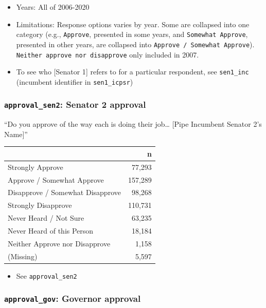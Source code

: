 \documentclass[10pt,article,oneside]{memoir}
\theoremstyle{definition}
\begin{document}
\begin{itemize}
\tightlist
\item
  Years: All of 2006-2020
\item
  Limitations: Response options varies by year. Some are collapsed into
  one category (e.g., \texttt{Approve}, presented in some years, and
  \texttt{Somewhat\ Approve}, presented in other years, are collapsed
  into \texttt{Approve\ /\ Somewhat\ Approve}).
  \texttt{Neither\ approve\ nor\ disapprove} only included in 2007.
\item
  To see who {[}Senator 1{]} refers to for a particular respondent, see
  \texttt{sen1\_inc} (incumbent identifier in \texttt{sen1\_icpsr})
\end{itemize}

\hypertarget{approval_sen2-senator-2-approval}{%
\subsubsection{\texorpdfstring{\texttt{approval\_sen2}: Senator 2
approval}{approval\_sen2: Senator 2 approval}}\label{approval_sen2-senator-2-approval}}

``Do you approve of the way each is doing their job\ldots{} {[}Pipe
Incumbent Senator 2's Name{]}''

\begin{table}[H]
\centering
\begin{tabular}[t]{lr}
\toprule
 & n\\
\midrule
Strongly Approve & 77,293\\
Approve / Somewhat Approve & 157,289\\
Disapprove / Somewhat Disapprove & 98,268\\
Strongly Disapprove & 110,731\\
Never Heard / Not Sure & 63,235\\
Never Heard of this Person & 18,184\\
Neither Approve nor Disapprove & 1,158\\
(Missing) & 5,597\\
\bottomrule
\end{tabular}
\end{table}

\begin{itemize}
\tightlist
\item
  See \texttt{approval\_sen2}
\end{itemize}

\hypertarget{approval_gov-governor-approval}{%
\subsubsection{\texorpdfstring{\texttt{approval\_gov}: Governor
approval}{approval\_gov: Governor approval}}\label{approval_gov-governor-approval}}
\end{document}
